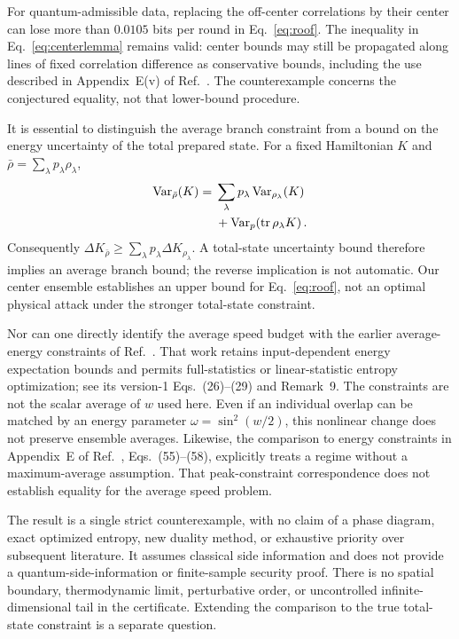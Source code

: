 \documentclass[aps,pra,reprint,amsmath,amssymb,longbibliography,nofootinbib]{revtex4-2}
\begin{document}
For quantum-admissible data, replacing the off-center correlations by their
center can lose more than $0.0105$ bits per round in Eq.~\eqref{eq:roof}.
The inequality in Eq.~\eqref{eq:centerlemma} remains valid: center bounds
may still be propagated along lines of fixed correlation difference as
conservative bounds, including the use described in Appendix~E(v) of
Ref.~\cite{JonesSpeed2026}. The counterexample concerns the conjectured
equality, not that lower-bound procedure.

It is essential to distinguish the average branch constraint from a bound
on the energy uncertainty of the total prepared state. For a fixed
Hamiltonian $K$ and $\bar\rho=\sum_\lambda p_\lambda\rho_\lambda$,
\begin{align}
 \operatorname{Var}_{\bar\rho}(K)
 ={}&\sum_\lambda p_\lambda\operatorname{Var}_{\rho_\lambda}(K)\notag\\
 &+\operatorname{Var}_{p}\!\left(\operatorname{tr}\rho_\lambda K\right).
\end{align}
Consequently $\Delta K_{\bar\rho}\geq\sum_\lambda p_\lambda\Delta K_{\rho_\lambda}$.
A total-state uncertainty bound therefore implies an average branch bound;
the reverse implication is not automatic. Our center ensemble establishes
an upper bound for Eq.~\eqref{eq:roof}, not an optimal physical attack under
the stronger total-state constraint.

Nor can one directly identify the average speed budget with the earlier
average-energy constraints of Ref.~\cite{VanHimbeeck2019}. That work retains
input-dependent energy expectation bounds and permits full-statistics or
linear-statistic entropy optimization; see its version-1 Eqs.~(26)--(29)
and Remark~9. The constraints are not the scalar average of $w$ used here.
Even if an individual overlap can be matched by an energy parameter
$\omega=\sin^2(w/2)$, this nonlinear change does not preserve ensemble averages.
Likewise, the comparison to energy constraints in Appendix~E of
Ref.~\cite{JonesSpatial2026}, Eqs.~(55)--(58), explicitly treats a regime
without a maximum-average assumption. That peak-constraint correspondence
does not establish equality for the average speed problem.

The result is a single strict counterexample, with no claim of a phase
diagram, exact optimized entropy, new duality method, or exhaustive priority
over subsequent literature. It assumes classical side information and does
not provide a quantum-side-information or finite-sample security proof.
There is no spatial boundary, thermodynamic limit, perturbative order, or
uncontrolled infinite-dimensional tail in the certificate. Extending the
comparison to the true total-state constraint is a separate question.
\end{document}

